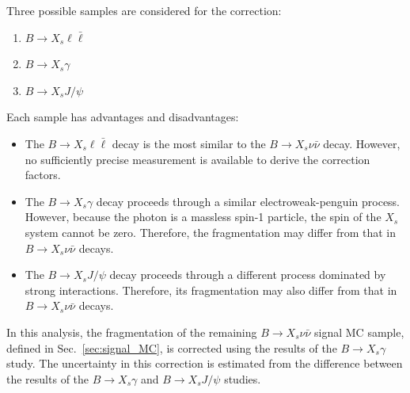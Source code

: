 Three possible samples are considered for the correction:
\begin{enumerate}
  \item $B \rightarrow X_{s} \ell \bar{\ell}$
  \item $B \rightarrow X_{s} \gamma$
  \item $B \rightarrow X_{s} J/\psi$
\end{enumerate}
Each sample has advantages and disadvantages:
\begin{itemize}
  \item The $B \rightarrow X_{s} \ell \bar{\ell}$ decay is the most similar to the $B \rightarrow X_{s} \nu \bar{\nu}$ decay.
  However, no sufficiently precise measurement is available to derive the correction factors.
  
  \item The $B \rightarrow X_{s} \gamma$ decay proceeds through a similar electroweak-penguin process.
  However, because the photon is a massless spin-1 particle, the spin of the $X_{s}$ system cannot be zero.
  Therefore, the fragmentation may differ from that in $B \rightarrow X_{s} \nu \bar{\nu}$ decays.
  
  \item The $B \rightarrow X_{s} J/\psi$ decay proceeds through a different process dominated by strong interactions.
  Therefore, its fragmentation may also differ from that in $B \rightarrow X_{s} \nu \bar{\nu}$ decays.
\end{itemize}
In this analysis, the fragmentation of the remaining $B \rightarrow X_{s} \nu \bar{\nu}$ signal MC sample, defined in Sec.~\ref{sec:signal_MC}, is corrected using the results of the $B \rightarrow X_{s} \gamma$ study.
The uncertainty in this correction is estimated from the difference between the results of the $B \rightarrow X_{s} \gamma$ and $B \rightarrow X_{s} J/\psi$ studies.


